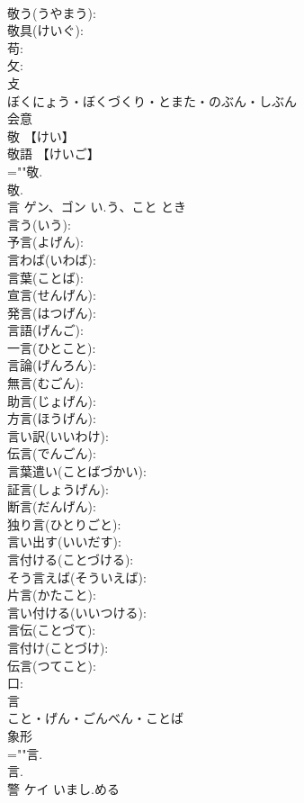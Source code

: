 \documentclass[8pt]{extreport}
\begin{document}
\begin{CJK}{UTF8}{min}
\\	敬う(うやまう): 
\\	敬具(けいぐ): 
\\	苟: 
\\	攵: 
\\	攴	
\\	ぼくにょう・ぼくづくり・とまた・のぶん・しぶん	
\\	会意 
\\	敬 【けい】 
\\	敬語 【けいご】 
\\	=""敬.
\\	敬.
\\	言	ゲン、ゴン	い.う、こと	とき	
\\	言う(いう): 
\\	予言(よげん): 
\\	言わば(いわば): 
\\	言葉(ことば): 
\\	宣言(せんげん): 
\\	発言(はつげん): 
\\	言語(げんご): 
\\	一言(ひとこと): 
\\	言論(げんろん): 
\\	無言(むごん): 
\\	助言(じょげん): 
\\	方言(ほうげん): 
\\	言い訳(いいわけ): 
\\	伝言(でんごん): 
\\	言葉遣い(ことばづかい): 
\\	証言(しょうげん): 
\\	断言(だんげん): 
\\	独り言(ひとりごと): 
\\	言い出す(いいだす): 
\\	言付ける(ことづける): 
\\	そう言えば(そういえば): 
\\	片言(かたこと): 
\\	言い付ける(いいつける): 
\\	言伝(ことづて): 
\\	言付け(ことづけ): 
\\	伝言(つてこと): 
\\	口: 
\\	言	
\\	こと・げん・ごんべん・ことば	
\\	象形 
\\	=""言.
\\	言.
\\	警	ケイ	いまし.める		

\end{CJK}
\end{document}
